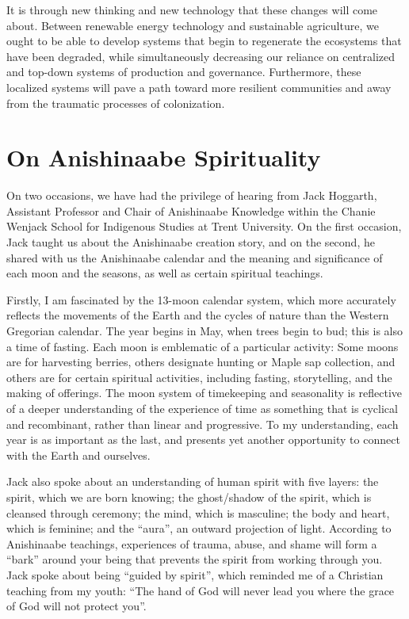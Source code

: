 \documentclass{report}
\begin{document}
\hspace{24pt} It is through new thinking and new technology that these changes will come about. Between renewable energy technology and sustainable agriculture, we ought to be able to develop systems that begin to regenerate the ecosystems that have been degraded, while simultaneously decreasing our reliance on centralized and top-down systems of production and governance. Furthermore, these localized systems will pave a path toward more resilient communities and away from the traumatic processes of colonization.

\section{On Anishinaabe Spirituality}

\hspace{24pt} On two occasions, we have had the privilege of hearing from Jack Hoggarth, Assistant Professor and Chair of Anishinaabe Knowledge within the Chanie Wenjack School for Indigenous Studies at Trent University. On the first occasion, Jack taught us about the Anishinaabe creation story, and on the second, he shared with us the Anishinaabe calendar and the meaning and significance of each moon and the seasons, as well as certain spiritual teachings.

\hspace{24pt} Firstly, I am fascinated by the 13-moon calendar system, which more accurately reflects the movements of the Earth and the cycles of nature than the Western Gregorian calendar. The year begins in May, when trees begin to bud; this is also a time of fasting. Each moon is emblematic of a particular activity: Some moons are for harvesting berries, others designate hunting or Maple sap collection, and others are for certain spiritual activities, including fasting, storytelling, and the making of offerings. The moon system of timekeeping and seasonality is reflective of a deeper understanding of the experience of time as something that is cyclical and recombinant, rather than linear and progressive. To my understanding, each year is as important as the last, and presents yet another opportunity to connect with the Earth and ourselves.

\hspace{24pt} Jack also spoke about an understanding of human spirit with five layers: the spirit, which we are born knowing; the ghost/shadow of the spirit, which is cleansed through ceremony; the mind, which is masculine; the body and heart, which is feminine; and the ``aura'', an outward projection of light. According to Anishinaabe teachings, experiences of trauma, abuse, and shame will form a ``bark'' around your being that prevents the spirit from working through you. Jack spoke about being ``guided by spirit'', which reminded me of a Christian teaching from my youth: ``The hand of God will never lead you where the grace of God will not protect you''.
\end{document}
